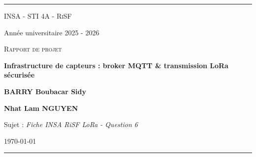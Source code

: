 \documentclass[a4paper,11pt]{report}
\newcommand{\projecttitle}{Infrastructure de capteurs : broker MQTT \& transmission LoRa sécurisée}
\newcommand{\authorone}{BARRY Boubacar Sidy}
\newcommand{\authortwo}{Nhat Lam NGUYEN}
\newcommand{\formation}{INSA - STI 4A - RiSF}
\newcommand{\anneeuniv}{2025 - 2026}
\begin{document}
\begin{titlepage}
    \centering
    {\color{secondary}\rule{\textwidth}{2pt}}

    \vspace{0.6cm}
    {\scshape\Large\color{primary} \formation \par}
    \vspace{0.2cm}
    {\large\color{codegray} Année universitaire \anneeuniv \par}

    \vspace{2cm}

    \begin{tcolorbox}[
        enhanced, sharp corners, boxrule=0pt,
        colback=primary, coltext=white,
        width=\textwidth, halign=center,
        drop shadow={black!40},
        top=10mm, bottom=10mm
    ]
        {\large\scshape Rapport de projet\par}
        \vspace{0.5cm}
        {\Huge\bfseries \projecttitle \par}
    \end{tcolorbox}

    \vspace{1.8cm}

    \begin{tcolorbox}[
        enhanced, colback=white, colframe=secondary,
        width=0.7\textwidth, halign=center, arc=3pt
    ]
        {\Large\bfseries \authorone \par}
        \vspace{2pt}
        {\Large\bfseries \authortwo \par}
    \end{tcolorbox}

    \vfill

    {\large Sujet : \emph{Fiche INSA RiSF LoRa - Question 6} \par}
    {\large \today \par}

    \vspace{0.4cm}
    {\color{secondary}\rule{\textwidth}{2pt}}
\end{titlepage}

\renewcommand{\abstractname}{Résumé}
\begin{abstract}
\noindent
Ce rapport présente la réalisation d'une infrastructure de capteurs sans fil combinant LoRa et MQTT.
Un premier ESP32 joue le rôle de capteur LoRa et publie périodiquement des mesures chiffrées.
Un second ESP32 agit comme passerelle : il reçoit les trames LoRa, vérifie leur authenticité,
déchiffre les données et les republie vers un broker MQTT. Enfin, un client Python exécuté sur Linux
s'abonne au broker, vérifie les messages reçus et permet de publier des trames de test ou de mettre
à jour les clés de sécurité. Le protocole applique un chiffrement AES-CBC et une authentification par
HMAC-SHA1 afin de protéger la confidentialité, l'intégrité et l'origine des données.
\end{abstract}
\end{document}
